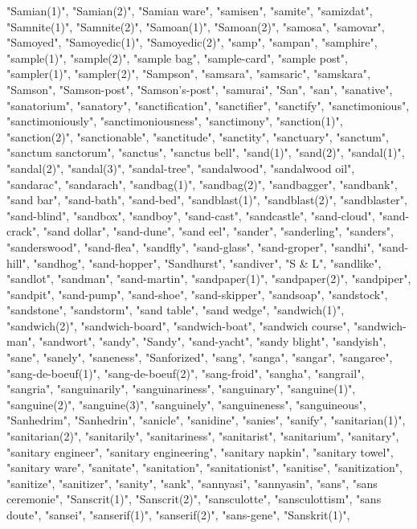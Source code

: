 "Samian(1)",
"Samian(2)",
"Samian ware",
"samisen",
"samite",
"samizdat",
"Samnite(1)",
"Samnite(2)",
"Samoan(1)",
"Samoan(2)",
"samosa",
"samovar",
"Samoyed",
"Samoyedic(1)",
"Samoyedic(2)",
"samp",
"sampan",
"samphire",
"sample(1)",
"sample(2)",
"sample bag",
"sample-card",
"sample post",
"sampler(1)",
"sampler(2)",
"Sampson",
"samsara",
"samsaric",
"samskara",
"Samson",
"Samson-post",
"Samson's-post",
"samurai",
"San",
"san",
"sanative",
"sanatorium",
"sanatory",
"sanctification",
"sanctifier",
"sanctify",
"sanctimonious",
"sanctimoniously",
"sanctimoniousness",
"sanctimony",
"sanction(1)",
"sanction(2)",
"sanctionable",
"sanctitude",
"sanctity",
"sanctuary",
"sanctum",
"sanctum sanctorum",
"sanctus",
"sanctus bell",
"sand(1)",
"sand(2)",
"sandal(1)",
"sandal(2)",
"sandal(3)",
"sandal-tree",
"sandalwood",
"sandalwood oil",
"sandarac",
"sandarach",
"sandbag(1)",
"sandbag(2)",
"sandbagger",
"sandbank",
"sand bar",
"sand-bath",
"sand-bed",
"sandblast(1)",
"sandblast(2)",
"sandblaster",
"sand-blind",
"sandbox",
"sandboy",
"sand-cast",
"sandcastle",
"sand-cloud",
"sand-crack",
"sand dollar",
"sand-dune",
"sand eel",
"sander",
"sanderling",
"sanders",
"sanderswood",
"sand-flea",
"sandfly",
"sand-glass",
"sand-groper",
"sandhi",
"sand-hill",
"sandhog",
"sand-hopper",
"Sandhurst",
"sandiver",
"S \& L",
"sandlike",
"sandlot",
"sandman",
"sand-martin",
"sandpaper(1)",
"sandpaper(2)",
"sandpiper",
"sandpit",
"sand-pump",
"sand-shoe",
"sand-skipper",
"sandsoap",
"sandstock",
"sandstone",
"sandstorm",
"sand table",
"sand wedge",
"sandwich(1)",
"sandwich(2)",
"sandwich-board",
"sandwich-boat",
"sandwich course",
"sandwich-man",
"sandwort",
"sandy",
"Sandy",
"sand-yacht",
"sandy blight",
"sandyish",
"sane",
"sanely",
"saneness",
"Sanforized",
"sang",
"sanga",
"sangar",
"sangaree",
"sang-de-boeuf(1)",
"sang-de-boeuf(2)",
"sang-froid",
"sangha",
"sangrail",
"sangria",
"sanguinarily",
"sanguinariness",
"sanguinary",
"sanguine(1)",
"sanguine(2)",
"sanguine(3)",
"sanguinely",
"sanguineness",
"sanguineous",
"Sanhedrim",
"Sanhedrin",
"sanicle",
"sanidine",
"sanies",
"sanify",
"sanitarian(1)",
"sanitarian(2)",
"sanitarily",
"sanitariness",
"sanitarist",
"sanitarium",
"sanitary",
"sanitary engineer",
"sanitary engineering",
"sanitary napkin",
"sanitary towel",
"sanitary ware",
"sanitate",
"sanitation",
"sanitationist",
"sanitise",
"sanitization",
"sanitize",
"sanitizer",
"sanity",
"sank",
"sannyasi",
"sannyasin",
"sans",
"sans ceremonie",
"Sanscrit(1)",
"Sanscrit(2)",
"sansculotte",
"sansculottism",
"sans doute",
"sansei",
"sanserif(1)",
"sanserif(2)",
"sans-gene",
"Sanskrit(1)",
